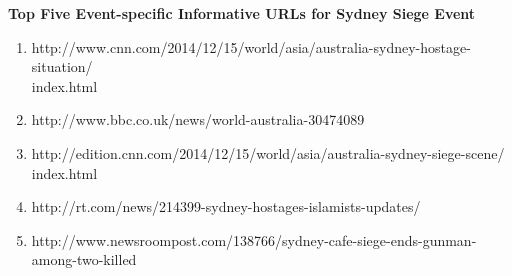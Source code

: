 \textbf{Top Five Event-specific Informative URLs for Sydney Siege Event}
\begin{enumerate}
\item http://www.cnn.com/2014/12/15/world/asia/australia-sydney-hostage-situation/\\index.html
\item http://www.bbc.co.uk/news/world-australia-30474089
\item http://edition.cnn.com/2014/12/15/world/asia/australia-sydney-siege-scene/\\index.html
\item http://rt.com/news/214399-sydney-hostages-islamists-updates/ 
\item http://www.newsroompost.com/138766/sydney-cafe-siege-ends-gunman-among-two-killed                                                                                                                                                                                                                                                                                                                                                                                                                                                                                                                
\end{enumerate}





